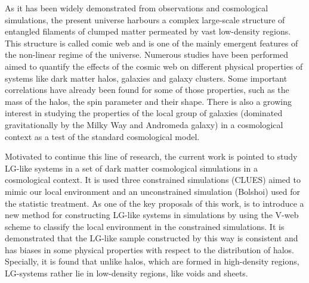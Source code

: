 

\begin{abstracts}


As it has been widely demonstrated from observations and cosmological 
simulations, the present universe harbours a complex large-scale structure
of entangled filaments of clumped matter permeated by vast low-density 
regions. This structure is called comic web and is one of the mainly 
emergent features of the non-linear regime of the universe. Numerous 
studies have been performed aimed to quantify the effects of the cosmic 
web on different physical properties of systems like dark matter halos, 
galaxies and galaxy clusters. Some important correlations have already 
been found for some of those properties, such as the mass of the halos, 
the spin parameter and their shape. There is also a growing interest in 
studying the properties of the local group of galaxies (dominated 
gravitationally by the Milky Way and Andromeda galaxy) in a cosmological
context as a test of the standard cosmological model.


Motivated to continue this line of research, the current work is pointed 
to study LG-like systems in a set of dark matter cosmological simulations 
in a cosmological context. It is used three constrained simulations (CLUES) 
aimed to mimic our local environment and an unconstrained simulation 
(Bolshoi) used for the statistic treatment. As one of the key proposals of 
this work, is to introduce a new method for constructing LG-like systems 
in simulations by using the V-web scheme to classify the local environment 
in the constrained simulations. It is demonstrated that the LG-like sample 
constructed by this way is consistent and has biases in some physical 
properties with respect to the distribution of halos. Specially, it is 
found that unlike halos, which are formed in high-density regions, 
LG-systems rather lie in low-density regions, like voids and sheets.



\end{abstracts}


